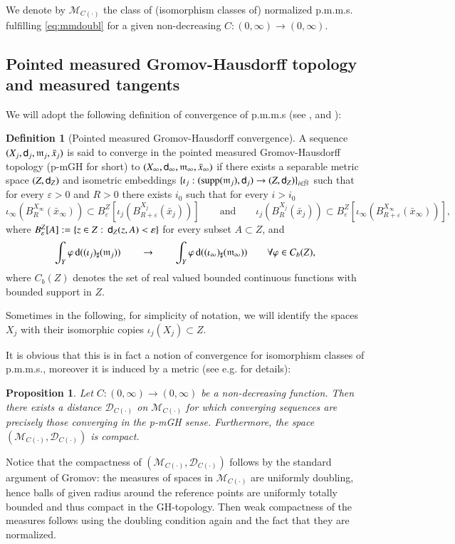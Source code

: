 \documentclass[11pt,reqno]{amsart}
\newcommand{\MM}{\mathscr{M}}
\newcommand{\supp}{\mathop{\rm supp}\nolimits}
\newcommand{\mm}{\mathfrak m}
\newcommand{\sfd}{{\sf d}}
\renewcommand{\d}{{\rm{d}}}
\newcommand{\N}{\mathbb{N}}
\newtheorem{proposition}[theorem]{Proposition}
\theoremstyle{definition}
\newtheorem{definition}[theorem]{Definition}
\theoremstyle{remark}
\theoremstyle{remark}
\theoremstyle{remark}
\theoremstyle{remark}
\theoremstyle{remark}
\theoremstyle{remark}
\theoremstyle{remark}
\begin{document}
We denote by $\MM_{C(\cdot)}$ the class of (isomorphism classes of) normalized p.m.m.s. fulfilling \eqref{eq:mmdoubl} for a given non-decreasing $C:(0,\infty)\to(0,\infty)$.
 
\subsection{Pointed measured Gromov-Hausdorff topology and  measured tangents}
We will adopt the following definition of convergence of p.m.m.s (see \cite{BuragoBuragoIvanov}, \cite{GMS2013}
 and  \cite{Villani09}):
\begin{definition}[Pointed measured Gromov-Hausdorff convergence]\label{def:conv}
A sequence $(X_j,\sfd_j,\mm_j,\bar{x}_j)$ is said to converge 
in the  pointed measured Gromov-Hausdorff topology (p-mGH for short) to 
$(X_\infty,\sfd_\infty,\mm_\infty,\bar{x}_\infty)$ if there 
exists a separable metric space $(Z,\sfd_Z)$ and isometric embeddings  
$\{\iota_j:(\supp(\mm_j),\sfd_j)\to (Z,\sfd_Z)\}_{i \in \bar{\N}}$ such that
for every 
$\varepsilon>0$ and $R>0$ there exists $i_0$ such that for every $i>i_0$
\[
\iota_\infty(B^{X_\infty}_R(\bar{x}_\infty)) \subset B^Z_{\varepsilon}[\iota_j(B^{X_j}_{R+\varepsilon} (\bar{x}_j))]  \qquad \text{and} \qquad  \iota_j(B^{X_j}_R(\bar{x}_j)) \subset B^Z_{\varepsilon}[\iota_\infty(B^{X_\infty}_{R+\varepsilon} (\bar{x}_\infty))], 
\]
where $B^Z_\varepsilon[A]:=\{z \in Z: \, \sfd_Z(z,A)<\varepsilon\}$ for every subset $A \subset Z$, and 
\[
\int_Y \varphi \, \d ((\iota_j)_\sharp(\mm_j))\qquad    \to \qquad  \int_Y \varphi \, \d  ((\iota_\infty)_\sharp(\mm_\infty)) \qquad \forall \varphi \in C_b(Z), 
\]
where $C_b(Z)$ denotes the set of real valued bounded continuous functions with bounded support in $Z$.
\end{definition}
Sometimes in the following, for simplicity of notation, we will identify the spaces $X_j$ with 
their isomorphic copies $\iota_j(X_j)\subset Z$. 

It is obvious that this is in fact a notion of convergence for isomorphism classes of p.m.m.s., moreover it is induced by a metric   (see e.g. \cite{GMS2013} for details):
\begin{proposition}\label{prop:comp}
Let $C:(0,\infty)\to (0,\infty)$ be a non-decreasing function. Then there exists a distance $\mathcal D_{C(\cdot)}$ on $\MM_{C(\cdot)}$ for which converging sequences are precisely those converging in the p-mGH sense. Furthermore, the space  $(\MM_{C(\cdot)},\mathcal D_{C(\cdot)})$  is compact.
\end{proposition}
Notice that the compactness of  $(\MM_{C(\cdot)},\mathcal D_{C(\cdot)})$ follows by the standard argument of Gromov: the measures of spaces in  $\MM_{C(\cdot)}$ are uniformly doubling, hence balls of given radius around the reference points are uniformly totally bounded and thus compact in the GH-topology. Then weak compactness of the measures follows using the doubling condition again and the fact that they are normalized.
\end{document}
